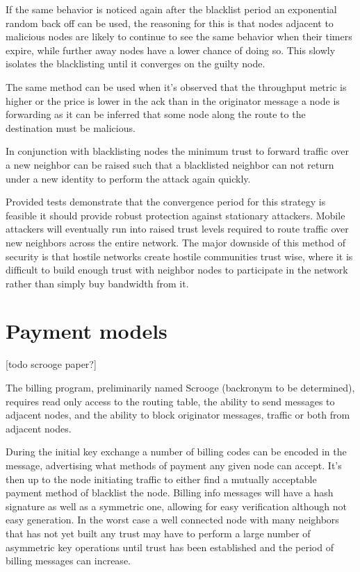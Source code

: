 \documentclass[11pt]{article}
\begin{document}
               If the same behavior is noticed again after the blacklist period an exponential random back off can be used, the reasoning for this is that nodes adjacent to malicious nodes are likely to continue to see the same behavior when their timers expire, while further away nodes have a lower chance of doing so. This slowly isolates the blacklisting until it converges on the guilty node.
               
               The same method can be used when it's observed that the throughput metric is higher or the price is lower in the ack than in the originator message a node is forwarding as it can be inferred that some node along the route to the destination must be malicious.
               
               In conjunction with blacklisting nodes the minimum trust to forward traffic over a new neighbor can be raised such that a blacklisted neighbor can not return under a new identity to perform the attack again quickly.
               
               Provided tests demonstrate that the convergence period for this strategy is feasible it should provide robust protection against stationary attackers. Mobile attackers will eventually run into raised trust levels required to route traffic over new neighbors across the entire network. The major downside of this method of security is that hostile networks create hostile communities trust wise, where it is difficult to build enough trust with neighbor nodes to participate in the network rather than simply buy bandwidth from it.
               
               
\section{Payment models} \label{pay}

    [todo scrooge paper?]

    The billing program, preliminarily named Scrooge (backronym to be determined), requires read only access to the routing table, the ability to send messages to adjacent nodes, and the ability to block originator messages, traffic or both from adjacent nodes.
    
    During the initial key exchange a number of billing codes can be encoded in the message, advertising what methods of payment any given node can accept. It's then up to the node initiating traffic to either find a mutually acceptable payment method of blacklist the node. Billing info messages will have a hash signature as well as a symmetric one, allowing for easy verification although not easy generation. In the worst case a well connected node with many neighbors that has not yet built any trust may have to perform a large number of asymmetric key operations until trust has been established and the period of billing messages can increase.
\end{document}
